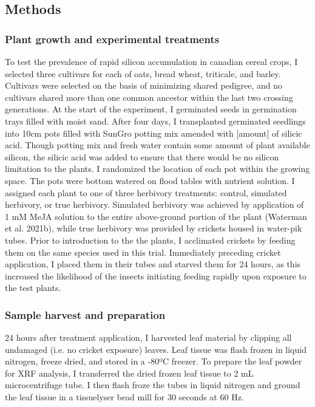 \documentclass[12pt, letterpaper, ]{article}
\begin{document}
\subsection{Methods}

\subsubsection{Plant growth and experimental treatments}

To test the prevalence of rapid silicon accumulation in canadian cereal crops, I selected three cultivars for each of oats, bread wheat, triticale, and barley. Cultivars were selected on the basis of minimizing shared pedigree, and no cultivars shared more than one common ancestor within the last two crossing generations. At the start of the experiment, I germinated seeds in germination trays filled with moist sand. After four days, I transplanted germinated seedlings into 10cm pots filled with SunGro potting mix amended with [amount] of silicic acid. Though potting mix and fresh water contain some amount of plant available silicon, the silicic acid was added to ensure that there would be no silicon limitation to the plants. I randomized the location of each pot within the growing space. The pots were bottom watered on flood tables with nutrient solution. I assigned each plant to one of three herbivory treatments: control, simulated herbivory, or true herbivory. Simulated herbivory was achieved by application of 1 mM MeJA solution to the entire above-ground portion of the plant (Waterman et al. 2021b), while true herbivory was provided by crickets housed in water-pik tubes. Prior to introduction to the the plants, I acclimated crickets by feeding them on the same species used in this trial. Immediately preceding cricket application, I placed them in their tubes and starved them for 24 hours, as this increased the likelihood of the insects initiating feeding rapidly upon exposure to the test plants. 

\subsubsection{Sample harvest and preparation}

24 hours after treatment application, I harvested leaf material by clipping all undamaged (i.e. no cricket exposure) leaves. Leaf tissue was flash frozen in liquid nitrogen, freeze dried, and stored in a -80ºC freezer. To prepare the leaf powder for XRF analysis, I transferred the dried frozen leaf tissue to 2 mL microcentrifuge tube. I then flash froze the tubes in liquid nitrogen and ground the leaf tissue in a tissuelyser bead mill for 30 seconds at 60 Hz.
\end{document}
